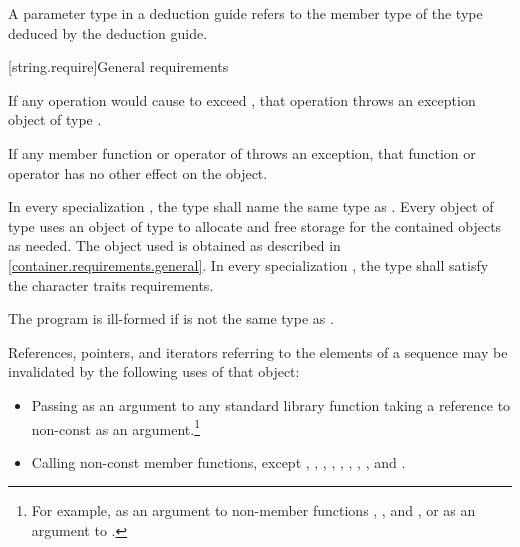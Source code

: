 \pnum
A  parameter type in
a  deduction guide
refers to the  member type of
the type deduced by the deduction guide.

[string.require]{General requirements}

\pnum
If any operation would cause  to
exceed , that operation throws an
exception object of type .

\pnum
If any member function or operator of  throws an exception, that
function or operator has no other effect on the  object.

\pnum
In every specialization ,
the type  shall name the same type
as . Every object of type
 uses an object of type
 to allocate and free storage for the contained 
objects as needed. The  object used is
obtained as described in \ref{container.requirements.general}.
In every specialization ,
the type  shall satisfy
the character traits requirements.
\begin{note}
The program is ill-formed if 
is not the same type as .
\end{note}

\pnum
References, pointers, and iterators referring to the elements of a
 sequence may be
invalidated by the following uses of that  object:

\begin{itemize}
\item Passing as an argument to any standard library function taking a reference to non-const
 as an argument.\footnote{For example, as an argument to non-member
functions ,
, and , or as
an argument to .}

\item Calling non-const member functions, except
,
,
,
,
,
,
,
,
and
.
\end{itemize}

